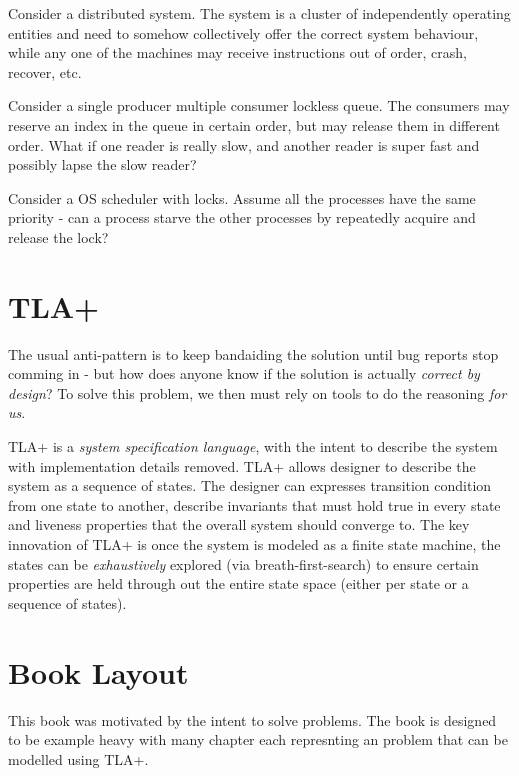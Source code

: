 \documentclass{report}
\begin{document}
Consider a distributed system. The system is a cluster of independently
operating entities and need to somehow collectively offer the correct system
behaviour, while any one of the machines may receive instructions out of order,
crash, recover, etc. \newline

Consider a single producer multiple consumer lockless queue. The consumers may 
reserve an index in the queue in certain order, but may release them in different order. 
What if one reader is really slow, and another reader is super fast and possibly 
lapse the slow reader? \newline

Consider a OS scheduler with locks. Assume all the processes have the same
priority - can a process starve the other processes by repeatedly acquire and release 
the lock?\newline

\section{TLA+}

The usual anti-pattern is to keep bandaiding the solution until bug reports stop
comming in - but how does anyone know if the solution is actually
\textit{correct by design}? To solve this problem, we then must rely on tools to
do the reasoning \textit{for us}.\newline 

TLA+ is a \textit{system specification language}, with the intent to describe
the system with implementation details removed. TLA+ allows designer to describe
the system as a sequence of states.  The designer can expresses transition
condition from one state to another, describe invariants that must hold true in
every state and liveness properties that the overall system should converge to.
The key innovation of TLA+ is once the system is modeled as a finite state
machine, the states can be \textit{exhaustively} explored (via
breath-first-search) to ensure certain properties are held through out the
entire state space (either per state or a sequence of states).\newline

\section{Book Layout}

This book was motivated by the intent to solve problems. The book is designed to
be example heavy with many chapter each represnting an problem that can be
modelled using TLA+.\newline
\end{document}
